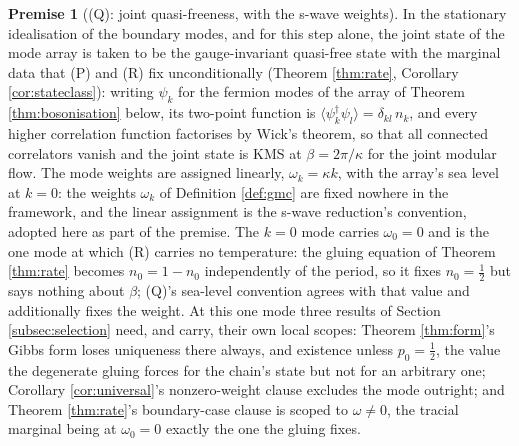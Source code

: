 \documentclass[11pt]{article}
\theoremstyle{definition}
\newtheorem{premise}[theorem]{Premise}
\begin{document}
\begin{premise}[(Q): joint quasi-freeness, with the s-wave weights]\label{prem:quasifree}
In the stationary idealisation of the boundary modes, and for this step alone, the joint state of the mode array is taken to be the gauge-invariant quasi-free state with the marginal data that (P) and (R) fix unconditionally (Theorem \ref{thm:rate}, Corollary \ref{cor:stateclass}): writing $\psi_k$ for the fermion modes of the array of Theorem \ref{thm:bosonisation} below, its two-point function is $\langle \psi^\dagger_k \psi_l \rangle = \delta_{kl}\,n_k$, and every higher correlation function factorises by Wick's theorem, so that all connected correlators vanish and the joint state is KMS at $\beta = 2\pi/\kappa$ for the joint modular flow. The mode weights are assigned linearly, $\omega_k = \kappa k$, with the array's sea level at $k = 0$: the weights $\omega_k$ of Definition \ref{def:gmc} are fixed nowhere in the framework, and the linear assignment is the s-wave reduction's convention, adopted here as part of the premise. The $k = 0$ mode carries $\omega_0 = 0$ and is the one mode at which (R) carries no temperature: the gluing equation of Theorem \ref{thm:rate} becomes $n_0 = 1 - n_0$ independently of the period, so it fixes $n_0 = \tfrac12$ but says nothing about $\beta$; (Q)'s sea-level convention agrees with that value and additionally fixes the weight. At this one mode three results of Section \ref{subsec:selection} need, and carry, their own local scopes: Theorem \ref{thm:form}'s Gibbs form loses uniqueness there always, and existence unless $p_0 = \tfrac12$, the value the degenerate gluing forces for the chain's state but not for an arbitrary one; Corollary \ref{cor:universal}'s nonzero-weight clause excludes the mode outright; and Theorem \ref{thm:rate}'s boundary-case clause is scoped to $\omega \neq 0$, the tracial marginal being at $\omega_0 = 0$ exactly the one the gluing fixes.
\end{premise}
\end{document}
